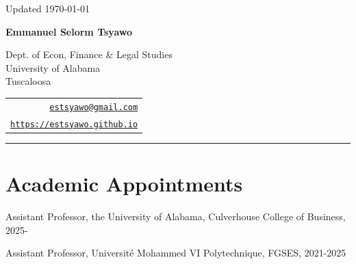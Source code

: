 \documentclass[12pt,letterpaper]{article}
\def\name{Emmanuel Selorm Tsyawo}
\renewenvironment{itemize}{
  \begin{list}{}{
    \setlength{\leftmargin}{1.5em}
  }
}{
  \end{list}
}
\begin{document}
\begin{minipage}{\linewidth}
  \begin{flushright}
    Updated \today
  \end{flushright}
\end{minipage}

\vspace{10pt}


\centerline{\huge \bf \name}

\vspace{0.25in}

\begin{minipage}{0.65\linewidth}
	Dept. of Econ, Finance \& Legal Studies \\
	University of Alabama\\
  Tuscaloosa\\
\end{minipage}
\begin{minipage}{0.5\linewidth}
  \begin{tabular}{r}
    \href{mailto:estsyawo@gmail.com}{\tt estsyawo@gmail.com} \\
    \href{https://estsyawo.github.io}{\tt https://estsyawo.github.io} \\
    
  \end{tabular}
\end{minipage}

\vspace{10pt}
\rule{\linewidth}{0.4pt}


\section*{Academic Appointments}
\begin{itemize}
  \item Assistant Professor, the University of Alabama, Culverhouse College of Business, 2025-
  \item Assistant Professor, Universit\'e Mohammed VI Polytechnique, FGSES, 2021-2025
\end{itemize}
\end{document}
